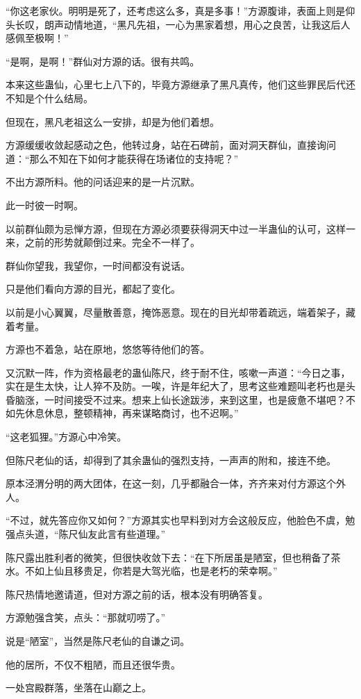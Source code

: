 \begin{this_body}
“你这老家伙。明明是死了，还考虑这么多，真是多事！”方源腹诽，表面上则是仰头长叹，朗声动情地道，“黑凡先祖，一心为黑家着想，用心之良苦，让我这后人感佩至极啊！”

“是啊，是啊！”群仙对方源的话。很有共鸣。

本来这些蛊仙，心里七上八下的，毕竟方源继承了黑凡真传，他们这些罪民后代还不知是个什么结局。

但现在，黑凡老祖这么一安排，却是为他们着想。

方源缓缓收敛起感动之色，他转过身，站在石碑前，面对洞天群仙，直接询问道：“那么不知在下如何才能获得在场诸位的支持呢？”

不出方源所料。他的问话迎来的是一片沉默。

此一时彼一时啊。

以前群仙颇为忌惮方源，但现在方源必须要获得洞天中过一半蛊仙的认可，这样一来，之前的形势就颠倒过来。完全不一样了。

群仙你望我，我望你，一时间都没有说话。

只是他们看向方源的目光，都起了变化。

以前是小心翼翼，尽量散善意，掩饰恶意。现在的目光却带着疏远，端着架子，藏着考量。

方源也不着急，站在原地，悠悠等待他们的答。

又沉默一阵，作为资格最老的蛊仙陈尺，终于耐不住，咳嗽一声道：“今日之事，实在是生太快，让人猝不及防。一唉，许是年纪大了，思考这些难题叫老朽也是头昏脑涨，一时间接受不过来。想来上仙长途跋涉，来到这里，也是疲惫不堪吧？不如先休息休息，整顿精神，再来谋略商讨，也不迟啊。”

“这老狐狸。”方源心中冷笑。

但陈尺老仙的话，却得到了其余蛊仙的强烈支持，一声声的附和，接连不绝。

原本泾渭分明的两大团体，在这一刻，几乎都融合一体，齐齐来对付方源这个外人。

“不过，就先答应你又如何？”方源其实也早料到对方会这般反应，他脸色不虞，勉强点头道，“陈尺仙友此言有些道理。”

陈尺露出胜利者的微笑，但很快收敛下去：“在下所居虽是陋室，但也稍备了茶水。不如上仙且移贵足，你若是大驾光临，也是老朽的荣幸啊。”

陈尺热情地邀请道，但对方源之前的话，根本没有明确答复。

方源勉强含笑，点头：“那就叨唠了。”

说是“陋室”，当然是陈尺老仙的自谦之词。

他的居所，不仅不粗陋，而且还很华贵。

一处宫殿群落，坐落在山巅之上。


\end{this_body}

